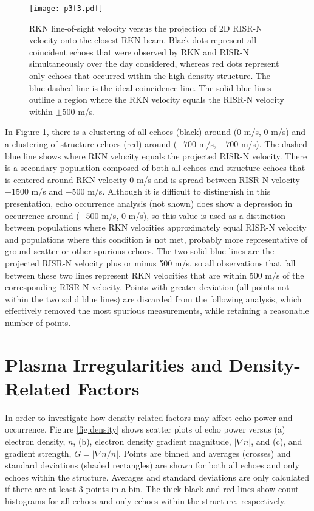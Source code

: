 \begin{figure}
	\texttt{[image: p3f3.pdf]}
  \caption[RKN/RISR-N Velocity Analysis]{RKN line-of-sight velocity versus the projection of 2D RISR-N velocity onto the closest RKN beam. Black dots represent all coincident echoes that were observed by RKN and RISR-N simultaneously over the day considered, whereas red dots represent only echoes that occurred within the high-density structure.  The blue dashed line is the ideal coincidence line. The solid blue lines outline a region where the RKN velocity equals the RISR-N velocity within \(\pm\)500 m/s.}
  \label{fig:velocity}
\end{figure}

In Figure \ref{fig:velocity}, there is a clustering of all echoes (black) around (0 m/s, 0 m/s) and a clustering of structure echoes (red) around (\(-700\) m/s, \(-700\) m/s).  The dashed blue line shows where RKN velocity equals the projected RISR-N velocity.  There is a secondary population composed of both all echoes and structure echoes that is centered around RKN velocity 0 m/s and is spread between RISR-N velocity \(-1500\) m/s and \(-500\) m/s.  Although it is difficult to distinguish in this presentation, echo occurrence analysis (not shown) does show a depression in occurrence around (\(-500\) m/s, 0 m/s), so this value is used as a distinction between populations where RKN velocities approximately equal RISR-N velocity and populations where this condition is not met, probably more representative of ground scatter or other spurious echoes.  The two solid blue lines are the projected RISR-N velocity plus or minus 500 m/s, so all observations that fall between these two lines represent RKN velocities that are within 500 m/s of the corresponding RISR-N velocity.  Points with greater deviation (all points not within the two solid blue lines) are discarded from the following analysis, which effectively removed the most spurious measurements, while retaining a reasonable number of points.

\section{Plasma Irregularities and Density-Related Factors}
In order to investigate how density-related factors may affect echo power and occurrence, Figure \ref{fig:density} shows scatter plots of echo power versus (a) electron density, \(n\), (b), electron density gradient magnitude, \(|\nabla n|\), and (c), and gradient strength, \(G = |\nabla n/n|\). Points are binned and averages (crosses) and standard deviations (shaded rectangles) are shown for both all echoes and only echoes within the structure.  Averages and standard deviations are only calculated if there are at least 3 points in a bin.  The thick black and red lines show count histograms for all echoes and only echoes within the structure, respectively.


